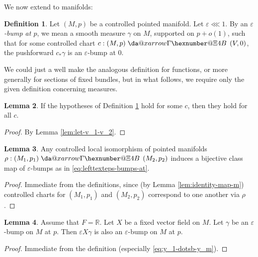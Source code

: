 \documentclass[reqno]{amsart}
\makeatletter
\newcommand*{\da@rightarrow}{\mathchar"0\hexnumber@\symAMSa 4B }
\newcommand*{\xdashrightarrow}[2][]{%
  \mathrel{%
    \mathpalette{\da@xarrow{#1}{#2}{}\da@rightarrow{\,}{}}{}%
  }%
}
\newcommand*{\da@xarrow}[7]{%
  \sbox0{$\ifx#7\scriptstyle\scriptscriptstyle\else\scriptstyle\fi#5#1#6\m@th$}%
  \sbox2{$\ifx#7\scriptstyle\scriptscriptstyle\else\scriptstyle\fi#5#2#6\m@th$}%
  \sbox4{$#7\dabar@\m@th$}%
  \dimen@=\wd0 %
  \ifdim\wd2 >\dimen@
    \dimen@=\wd2 %
  \fi
  \count@=2 %
  \def\da@bars{\dabar@\dabar@}%
  \@whiledim\count@\wd4<\dimen@\do{%
    \advance\count@\@ne
    \expandafter\def\expandafter\da@bars\expandafter{%
      \da@bars
      \dabar@ 
    }%
  }%
  \mathrel{#3}%
  \mathrel{%
    \mathop{\da@bars}\limits
    \ifx\\#1\\%
    \else
      _{\copy0}%
    \fi
    \ifx\\#2\\%
    \else
      ^{\copy2}%
    \fi
  }%
  \mathrel{#4}%
}
\def\eps{\varepsilon}
\theoremstyle{plain} \newtheorem{theorem} {Theorem}
\theoremstyle{definition} \newtheorem{definition} [theorem] {Definition}
\theoremstyle{itplain} %
\newtheorem{lemma}[theorem]{Lemma}
\numberwithin{equation}{section}
\numberwithin{theorem}{section}
\makeatother
\begin{document}
We now extend to manifolds:

\begin{definition}\label{defn:let-m-p-1}
  Let $(M,p)$ be a controlled pointed manifold.  Let $\eps \lll 1$.  By an \emph{$\eps$-bump at $p$}, we mean a smooth measure $\gamma$ on $M$, supported on $p + o(1)$, such that for some controlled chart $c : (M,p) \xdashrightarrow{} (V,0)$, the pushforward $c_* \gamma$ is an $\eps$-bump at $0$.
\end{definition}
\begin{remark}
  We could just a well make the analogous definition for functions, or more generally for sections of fixed bundles, but in what follows, we require only the given definition concerning measures.
\end{remark}
\begin{lemma}
  If the hypotheses of Definition \ref{defn:let-m-p-1} hold for some $c$, then they hold for all $c$.
\end{lemma}
\begin{proof}
  By Lemma \ref{lem:let-v_1-v_2}.
\end{proof}
\begin{lemma}\label{lem:standard2:any-controlled-local}
  Any controlled local isomorphism of pointed manifolds $\rho : (M_1, p_1) \xdashrightarrow{} (M_2, p_2)$ induces a bijective class map of $\eps$-bumps as in \eqref{eq:lefttexteps-bumps-at}.
\end{lemma}
\begin{proof}
  Immediate from the definitions, since (by Lemma \ref{lem:identity-map-m})  controlled charts for $(M_1,p_1)$ and $(M_2,p_2)$ correspond to one another via $\rho$.
\end{proof}


\begin{lemma}\label{lem:standard2:bump-preserved-under-vector-field}
  Assume that $F = \mathbb{R}$.  Let $X$ be a fixed vector field on $M$.  Let $\gamma$ be an $\eps$-bump on $M$ at $p$.  Then $\eps X \gamma$ is also an $\eps$-bump on $M$ at $p$.
\end{lemma}
\begin{proof}
  Immediate from the definition (especially \eqref{eq:y_1-dotsb-y_m}).
\end{proof}
\end{document}
